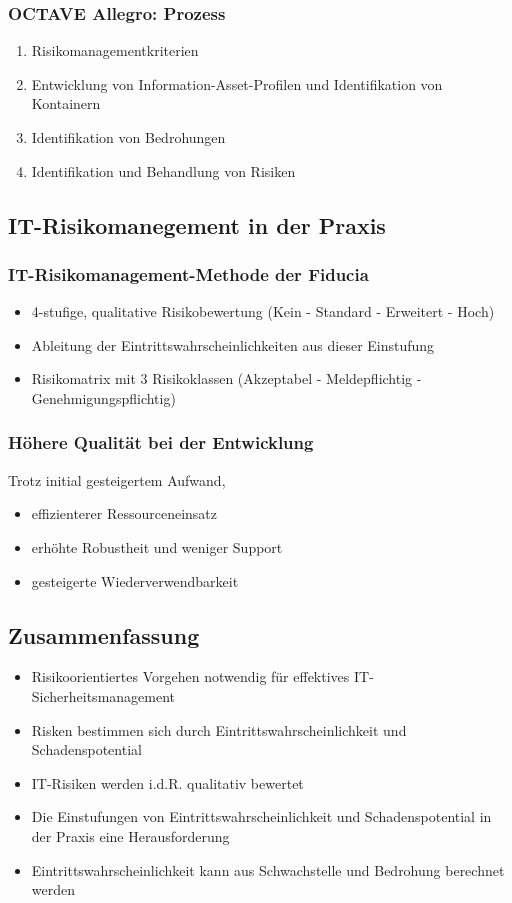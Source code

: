 \subsubsection{OCTAVE Allegro: Prozess}
\begin{enumerate}
	\item Risikomanagementkriterien
	\item Entwicklung von Information-Asset-Profilen und Identifikation von Kontainern
	\item Identifikation von Bedrohungen
	\item Identifikation und Behandlung von Risiken
\end{enumerate}


\subsection{IT-Risikomanegement in der Praxis}

\subsubsection{IT-Risikomanagement-Methode der Fiducia}
\begin{itemize}
	\item 4-stufige, qualitative Risikobewertung (Kein - Standard - Erweitert - Hoch)
	\item Ableitung der Eintrittswahrscheinlichkeiten aus dieser Einstufung
	\item Risikomatrix mit 3 Risikoklassen (Akzeptabel - Meldepflichtig - Genehmigungspflichtig)
\end{itemize}

\subsubsection{Höhere Qualität bei der Entwicklung}
Trotz initial gesteigertem Aufwand,

\begin{itemize}
	\item effizienterer Ressourceneinsatz
	\item erhöhte Robustheit und weniger Support
	\item gesteigerte Wiederverwendbarkeit
\end{itemize}


\subsection{Zusammenfassung}
\begin{itemize}
	\item Risikoorientiertes Vorgehen notwendig für effektives IT-Sicherheitsmanagement
	\item Risken bestimmen sich durch Eintrittswahrscheinlichkeit und Schadenspotential
	\item IT-Risiken werden i.d.R. qualitativ bewertet
	\item Die Einstufungen von Eintrittswahrscheinlichkeit und Schadenspotential in der Praxis eine Herausforderung
	\item Eintrittswahrscheinlichkeit kann aus Schwachstelle und Bedrohung berechnet werden
\end{itemize}



